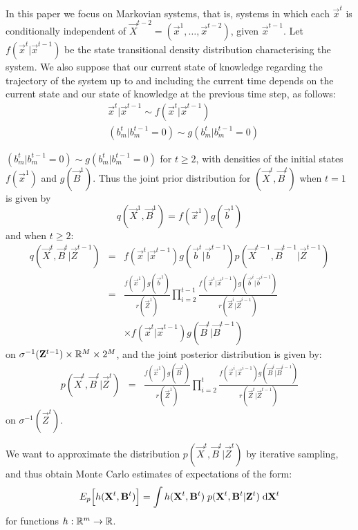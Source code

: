 In this paper we focus on Markovian systems, that is, systems in which each $\vec{x}^t$ is conditionally independent of $\vec{X}^{t-2} = (\vec{x}^1, \ldots,\vec{x}^{t-2})$, given $\vec{x}^{t-1}$. Let $f(\vec{x}^t | \vec{x}^{t-1})$ be the state transitional density distribution characterising the system. We also suppose that our current state of knowledge regarding the trajectory of the system up to and including the current time depends on the current state and our state of knowledge at the previous time step, as follows:
\begin{align*}
    &\vec{x}^t | \vec{x}^{t-1} \sim f(\vec{x}^t | \vec{x}^{t-1})\\
    &(b_m^t | b_m^{t-1} = 0) \sim g(b_m^t | b_m^{t-1} = 0)
\end{align*}

$(b_m^t | b_m^{t-1} = 0) \sim g(b_m^t | b_m^{t-1} = 0)$
for $t \geq 2$, with densities of the initial states $f(\vec{x}^1)$ and $g(\vec{B}^1)$.
Thus the joint prior distribution for $(\vec{X}^t,\vec{B}^t)$ when $t=1$ is given by 
\[
q(\vec{X}^1,\vec{B}^1) = f(\vec{x}^1)g(\vec{b}^1)
\]
and when $t \geq 2$: 
\begin{eqnarray*}
    q(\vec{X}^t, \vec{B}^t | \vec{Z}^{t-1}) &=& f(\vec{x}^t | \vec{x}^{t-1}) g(\vec{b}^t | \vec{b}^{t-1}) p(\vec{X}^{t-1}, \vec{B}^{t-1} | \vec{Z}^{t-1}) \\
    & = & \frac{f(\vec{x}^1)g(\vec{b}^1)}{r(\vec{Z}^1)} \prod_{i=2}^{t-1} \frac{f(\vec{x}^i | \vec{x}^{i-1}) g(\vec{b}^i | \vec{b}^{i-1})}{r(\vec{Z}^i | \vec{Z}^{i-1})} \\
    & & \times f(\vec{x}^t | \vec{x}^{t-1}) g(\vec{B}^t | \vec{B}^{t-1})
\end{eqnarray*}
on $\sigma^{-1}(\mathbf{Z}^{t-1}) \times \mathbb R^M \times 2^M$, and the joint posterior distribution is given by:
\begin{eqnarray*}
    p(\vec{X}^t, \vec{B}^t | \vec{Z}^t) 
& = & \frac{f(\vec{x}^1)g(\vec{B}^1)}{r(\vec{Z}^1)} \prod_{i=2}^t \frac{f(\vec{x}^i | \vec{x}^{i-1}) g(\vec{B}^i | \vec{B}^{i-1})}{r(\vec{Z}^t | \vec{Z}^{t-1})} 
\end{eqnarray*}
on $\sigma^{-1}(\vec{Z}^t)$.


We want to approximate the distribution $p(\vec{X}^{t}, \vec{B}^{t} | \vec{Z}^{t})$ by iterative sampling, and thus obtain Monte Carlo estimates of expectations of the form:
\begin{equation*}
    E_{p} \Big[h(\mathbf{X}^{t}, \mathbf{B}^{t} ) \Big] = \int h(\mathbf{X}^{t}, \mathbf{B}^{t})\; p(\mathbf{X}^{t}, \mathbf{B}^{t} | \mathbf{Z}^{t})\; \mathrm{d} \mathbf{X}^{t}
\end{equation*}
for functions $h: \mathbb R^m  \rightarrow \mathbb R$. 

